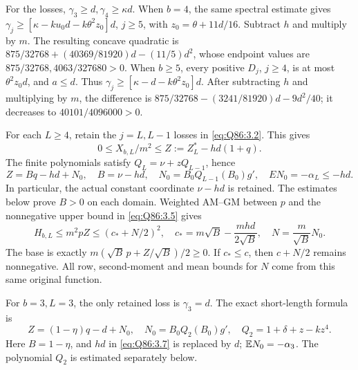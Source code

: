 For the losses, \(\gamma_3\ge\allowbreak  d,\allowbreak \gamma_4\ge\allowbreak \kappa d\).
When \(b=\allowbreak 4\), the same spectral estimate gives
\(\gamma_j\ge\allowbreak [\kappa-ku_0d-k\theta^2z_0]d\), \(j\ge\allowbreak 5\), with
\(z_0=\allowbreak \theta+11d/16\).
Subtract \(h\) and multiply by \(m\).
The resulting concave quadratic is
\(875/32768+(40369/81920)d-(11/5)d^2\),
whose endpoint values are \(875/32768,\allowbreak 4063/327680>\allowbreak 0\).
When \(b\ge\allowbreak 5\), every positive \(D_j\), \(j\ge\allowbreak 4\), is at most
\(\theta^2z_0d\), and \(a\le\allowbreak  d\).
Thus \(\gamma_j\ge\allowbreak [\kappa-d-k\theta^2z_0]d\).
After subtracting \(h\) and multiplying by \(m\), the difference is
\(875/32768-(3241/81920)d-9d^2/40\);
it decreases to \(40101/4096000>\allowbreak 0\).

For each \(L\ge\allowbreak 4\), retain the \(j=\allowbreak L,\allowbreak L-1\) losses in
\eqref{eq:Q86:3.2}. This gives
\[
0\le X_{b,L}/m^2\le Z:=Z_L^*-hd(1+q).
\tag{Q86.3.5}\label{eq:Q86:3.5}
\]
The finite polynomials satisfy \(Q_L=\allowbreak \nu+zQ_{L-1}\), hence
\[
Z=Bq-hd+N_0,\quad B=\nu-hd,\quad
N_0=B_0Q_{L-1}(B_0)g',\quad EN_0=-\alpha_L\le-hd.
\tag{Q86.3.6}\label{eq:Q86:3.6}
\]
In particular, the actual constant coordinate \(\nu-hd\) is retained.
The estimates below prove \(B>\allowbreak 0\) on each domain.
Weighted AM--GM between \(p\) and the nonnegative upper bound in
\eqref{eq:Q86:3.5} gives
\[
H_{b,L}\le m^2pZ
\le\left(c_*+N/2\right)^2,
\quad
c_*=m\sqrt B-\frac{mhd}{2\sqrt B},\quad
N=\frac m{\sqrt B}N_0.
\tag{Q86.3.7}\label{eq:Q86:3.7}
\]
The base is exactly \(m(\sqrt B\,\allowbreak p+Z/\sqrt B)/2\ge\allowbreak 0\).
If \(c_*\le\allowbreak  c\), then \(c+N/2\) remains nonnegative.
All row, second-moment and mean bounds for \(N\) come from this same original function.

For \(b=\allowbreak 3,\allowbreak L=\allowbreak 3\), the only retained loss is \(\gamma_3=\allowbreak d\).
The exact short-length formula is
\[
Z=(1-\eta)q-d+N_0,\quad N_0=B_0Q_2(B_0)g',
\quad Q_2=1+\delta+z-kz^4.
\tag{Q86.3.8}\label{eq:Q86:3.8}
\]
Here \(B=\allowbreak 1-\eta\), and \(hd\) in \eqref{eq:Q86:3.7} is replaced by \(d\);
\(\mathbb E N_0=\allowbreak -\alpha_3\).
The polynomial \(Q_2\) is estimated separately below.

